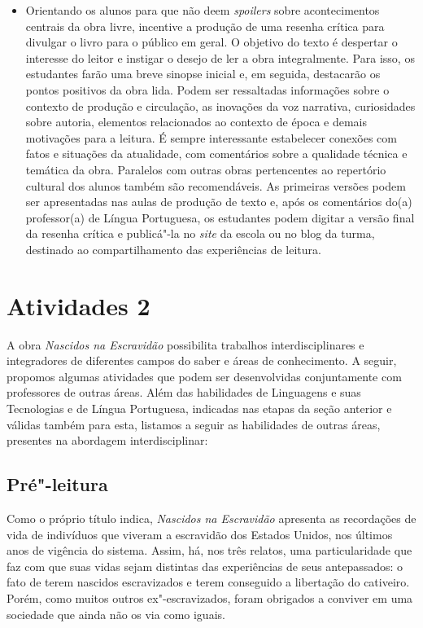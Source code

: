 \documentclass[11pt]{extarticle}
\begin{document}
\begin{itemize}
\item
  Orientando os alunos para que não deem \emph{spoilers} sobre
  acontecimentos centrais da obra livre, incentive a produção de uma
  resenha crítica para divulgar o livro para o público em geral. O
  objetivo do texto é despertar o interesse do leitor e instigar o
  desejo de ler a obra integralmente. Para isso, os estudantes farão uma
  breve sinopse inicial e, em seguida, destacarão os pontos positivos da
  obra lida. Podem ser ressaltadas informações sobre o contexto de
  produção e circulação, as inovações da voz narrativa, curiosidades
  sobre autoria, elementos relacionados ao contexto de época e demais
  motivações para a leitura. É sempre interessante estabelecer conexões
  com fatos e situações da atualidade, com comentários sobre a qualidade
  técnica e temática da obra. Paralelos com outras obras pertencentes ao
  repertório cultural dos alunos também são recomendáveis. As primeiras
  versões podem ser apresentadas nas aulas de produção de texto e, após
  os comentários do(a) professor(a) de Língua Portuguesa, os estudantes
  podem digitar a versão final da resenha crítica e publicá"-la no
  \emph{site} da escola ou no blog da turma, destinado ao
  compartilhamento das experiências de leitura.
\end{itemize}

\section{Atividades 2}

A obra \emph{Nascidos na Escravidão} possibilita trabalhos
interdisciplinares e integradores de diferentes campos do saber e áreas
de conhecimento. A seguir, propomos algumas atividades que podem ser
desenvolvidas conjuntamente com professores de outras áreas. Além das
habilidades de Linguagens e suas Tecnologias e de Língua Portuguesa,
indicadas nas etapas da seção anterior e válidas também para esta,
listamos a seguir as habilidades de outras áreas, presentes na abordagem
interdisciplinar:

\subsection{Pré"-leitura}


Como o próprio título indica, \emph{Nascidos na Escravidão}
apresenta as recordações de vida de indivíduos que viveram a escravidão
dos Estados Unidos, nos últimos anos de vigência do sistema. Assim, há,
nos três relatos, uma particularidade que faz com que suas vidas sejam
distintas das experiências de seus antepassados: o fato de terem
nascidos escravizados e terem conseguido a libertação do cativeiro.
Porém, como muitos outros ex"-escravizados, foram obrigados a conviver em
uma sociedade que ainda não os via como iguais.
\end{document}
